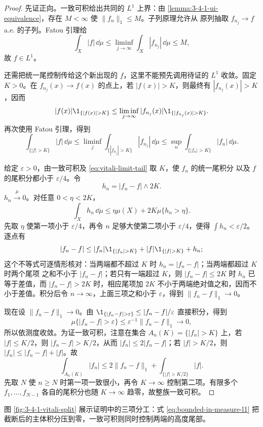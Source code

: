 \begin{proof}
先证正向。一致可积给出共同的 $L^1$ 上界：由
\cref{lemma:3-4-1-ui-equivalence}，存在 $M<\infty$ 使 $\|f_n\|_1\le M$。子列原理允许从
原列抽取 $f_{n_j}\to f$ a.e. 的子列。Fatou 引理给
\[
  \int_X|f|\,\dd\mu
  \le\liminf_{j\to\infty}\int_X|f_{n_j}|\,\dd\mu\le M,
\]
故 $f\in L^1$。

还需把统一尾控制传给这个新出现的 $f$，这里不能预先调用待证的 $L^1$ 收敛。固定 $K>0$。在
$f_{n_j}(x)\to f(x)$ 的点上，若 $|f(x)|>K$，则最终有 $|f_{n_j}(x)|>K$，因而
\[
 |f(x)|\1_{\{|f(x)|>K\}}
 \le\liminf_{j\to\infty}
 |f_{n_j}(x)|\1_{\{|f_{n_j}(x)|>K\}}.
\]
再次使用 Fatou 引理，得到
\[
 \int_{\{|f|>K\}}|f|\,\dd\mu
 \le\liminf_j\int_{\{|f_{n_j}|>K\}}|f_{n_j}|\,\dd\mu
 \le\sup_n\int_{\{|f_n|>K\}}|f_n|\,\dd\mu.
 \tag{3.4.2}\label{eq:vitali-limit-tail}
\]

给定 $\varepsilon>0$，由一致可积及 \eqref{eq:vitali-limit-tail} 取 $K$，使 $f_n$ 的统一尾积分
以及 $f$ 的尾积分都小于 $\varepsilon/4$。令
\[
 h_n=|f_n-f|\wedge 2K.
\]
$h_n\xrightarrow{\mu}0$。对任意 $0<\eta<2K$，
\[
 \int_Xh_n\,\dd\mu
 \le \eta\mu(X)+2K\mu\{h_n>\eta\}.
 \tag{3.4.3}\label{eq:bounded-in-measure-l1}
\]
先取 $\eta$ 使第一项小于 $\varepsilon/4$，再令 $n$ 足够大使第二项小于 $\varepsilon/4$，便得
$\int h_n<\varepsilon/2$。逐点有
\[
 |f_n-f|
 \le |f_n|\1_{\{|f_n|>K\}}
    +|f|\1_{\{|f|>K\}}+h_n;
\]
这个不等式可逐情形核对：当两端都不超过 $K$ 时 $h_n=|f_n-f|$；当两端都超过 $K$ 时两个尾项
之和不小于 $|f_n-f|$；若只有一端超过 $K$，则 $|f_n-f|\le2K$ 时 $h_n$ 已等于差值，而
$|f_n-f|>2K$ 时，相应尾项加 $2K$ 不小于两端绝对值之和，因而不小于差值。积分后令
$n\to\infty$，上面三项之和小于 $\varepsilon$，得到
$\|f_n-f\|_1\to0$。

现在设 $\|f_n-f\|_1\to0$。由
$\1_{\{|f_n-f|>\varepsilon\}}\le|f_n-f|/\varepsilon$ 直接积分，得到
\[
 \mu\{|f_n-f|>\varepsilon\}
 \le\varepsilon^{-1}\|f_n-f\|_1\longrightarrow0,
\]
所以依测度收敛。为证一致可积，注意在集合 $A_n(K)=\{|f_n|>K\}$ 上，若
$|f|\le K/2$，则 $|f_n-f|>K/2$，从而 $|f_n|\le2|f_n-f|$；若 $|f|>K/2$，则
$|f_n|\le|f_n-f|+|f|$。故
\[
 \int_{A_n(K)}|f_n|
 \le2\|f_n-f\|_1+
      \int_{\{|f|>K/2\}}|f|.
 \tag{3.4.4}\label{eq:l1-convergence-ui-tail}
\]
先取 $N$ 使 $n\ge N$ 时第一项一致很小，再令 $K\to\infty$ 控制第二项。有限多个
$f_1,\dots,f_{N-1}$ 各自的尾积分也随 $K\to\infty$ 趋零，故整族一致可积。
\end{proof}

图 \ref{fig:3-4-1-vitali-split} 展示证明中的三项分工：式
\eqref{eq:bounded-in-measure-l1} 把截断后的主体积分压到零，一致可积则同时控制两端的高度尾部。

